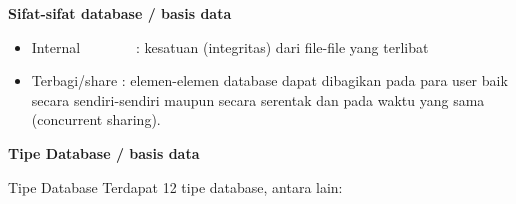 \vspace{12pt}
\noindent 
\textbf{Sifat-sifat database / basis data} \par
\noindent 
\begin{itemize}
\item Internal~~~~~~~~:  kesatuan (integritas) dari file-file yang terlibat \par
\noindent 
\item Terbagi/share : elemen-elemen database dapat dibagikan pada para user baik secara sendiri-sendiri maupun secara serentak dan pada waktu yang sama (concurrent sharing).\end{itemize}
 \par
\vspace{12pt}
\noindent 
\textbf{Tipe Database / basis data} \par
\noindent 
Tipe Database Terdapat 12 tipe database, antara lain: \par
\noindent 
